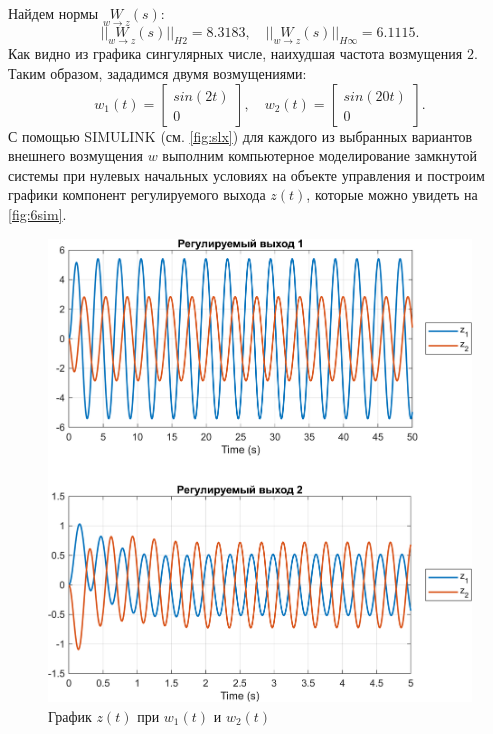 \noindent Найдем нормы $\underset{w\rightarrow z}{W}(s)$:
\begin{equation*}
    ||\underset{w\rightarrow z}{W}(s)||_{H2}=8.3183,\quad
    ||\underset{w\rightarrow z}{W}(s)||_{H\infty}=6.1115.
\end{equation*}
Как видно из графика сингулярных числе, наихудшая частота возмущения $2$.
Таким образом, зададимся двумя возмущениями:
\begin{equation*}
    w_1(t)=\begin{bmatrix}
        sin(2t)\\
        0
    \end{bmatrix},\quad
    w_2(t)=\begin{bmatrix}
        sin(20t)\\
        0
    \end{bmatrix}.
\end{equation*}
С помощью SIMULINK (см. \autoref{fig:slx}) для каждого из выбранных вариантов внешнего возмущения $w$ выполним 
компьютерное моделирование замкнутой системы при нулевых начальных условиях
на объекте управления и построим графики компонент регулируемого выхода
$z(t)$, которые можно увидеть на \autoref{fig:6sim}.
\begin{figure}[H]
    \centering
    \includegraphics[width=1\linewidth]{figs/6_sim.png}
    \caption{График $z(t)$ при $w_1(t)$ и $w_2(t)$}
    \label{fig:6sim}
\end{figure}

